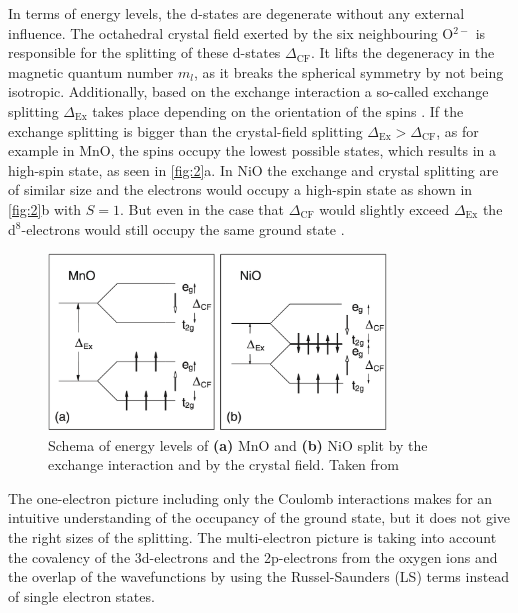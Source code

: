 In terms of energy levels, the d-states are degenerate without any external influence.
The octahedral crystal field exerted by the six neighbouring O$^{2-}$ is responsible for the splitting of these d-states $\Delta_{\text{CF}}$.
It lifts the degeneracy in the magnetic quantum number $m_l$, as it breaks the spherical symmetry by not being isotropic.
Additionally, based on the exchange interaction a so-called exchange splitting $\Delta_{\text{Ex}}$ takes place depending on the orientation of the spins .
If the exchange splitting is bigger than the crystal-field splitting $\Delta_{\text{Ex}} > \Delta_{\text{CF}}$, as for example in MnO, the spins occupy the lowest possible states, which results in a high-spin state, as seen in \autoref{fig:2}a.
In NiO the exchange and crystal splitting are of similar size and the electrons would occupy a high-spin state as shown in \autoref{fig:2}b with $S=1$. But even in the case that $\Delta_{\text{CF}}$ would slightly exceed $\Delta_{\text{Ex}}$ the d$^8$-electrons would still occupy the same ground state .
\begin{figure}[ht]
    \centering
    \includegraphics[width=0.8\textwidth]{pictures/2.png}
    \caption{Schema of energy levels of \textbf{(a)} MnO and \textbf{(b)} NiO split by the exchange interaction and by the crystal field. Taken from }
    \label{fig:2}
\end{figure}
\FloatBarrier
The one-electron picture including only the Coulomb interactions makes for an intuitive understanding of the occupancy of the ground state, but it does not give the right sizes of the splitting.
The multi-electron picture is taking into account the covalency of the 3d-electrons and the 2p-electrons from the oxygen ions and the overlap of the wavefunctions by using the Russel-Saunders (LS) terms instead of single electron states.
